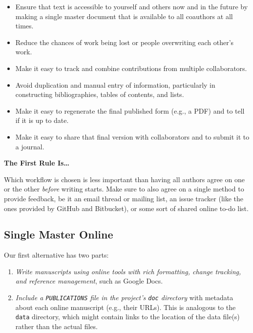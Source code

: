 \documentclass[10pt]{article}
\newcommand{\recommend}[1]{\textit{#1}}
\begin{document}
\begin{itemize}

\item
  Ensure that text is accessible to yourself and others now and in the
  future by making a single master document that is available to all
  coauthors at all times.

\item
  Reduce the chances of work being lost or people overwriting each
  other's work.

\item
  Make it easy to track and combine contributions from multiple
  collaborators.

\item
  Avoid duplication and manual entry of information, particularly in
  constructing bibliographies, tables of contents, and lists.

\item
  Make it easy to regenerate the final published form (e.g., a PDF)
  and to tell if it is up to date.

\item
  Make it easy to share that final version with collaborators and to
  submit it to a journal.

\end{itemize}

\begin{framed}
  \noindent \textbf{The First Rule Is{\ldots}}

  Which workflow is chosen is less important than having all authors
  agree on one or the other \emph{before} writing starts. Make sure to
  also agree on a single method to provide feedback, be it an email
  thread or mailing list, an issue tracker (like the ones provided by
  GitHub and Bitbucket), or some sort of shared online to-do list.
\end{framed}

\subsection*{Single Master Online}

Our first alternative has two parts:

\begin{enumerate}

\item
  \recommend{Write manuscripts using online tools with rich
    formatting, change tracking, and reference management}, such as
  Google Docs.

\item
  \recommend{Include a \texttt{PUBLICATIONS} file in the project's
    \texttt{doc} directory} with metadata about each online manuscript
  (e.g., their URLs). This is analogous to the \texttt{data}
  directory, which might contain links to the location of the data
  file(s) rather than the actual files.

\end{enumerate}
\end{document}

